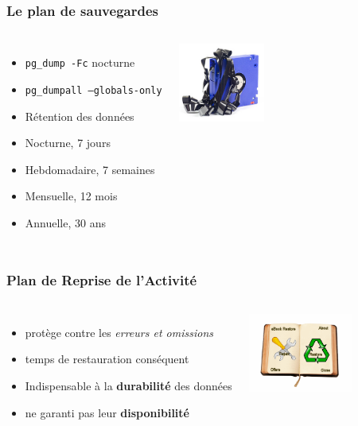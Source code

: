 \documentclass[english]{beamer}
\begin{document}
\begin{frame}[fragile]
  \frametitle{Le plan de sauvegardes}


\begin{columns}[c]

  \begin{itemize}
   \item<1-> \texttt{pg\_dump -Fc} nocturne
   \item<1-> \texttt{pg\_dumpall --globals-only}
   \item<2-> Rétention des données
   \item<2-> Nocturne, 7 jours
   \item<2-> Hebdomadaire, 7 semaines
   \item<2-> Mensuelle, 12 mois
   \item<3-> Annuelle, 30 ans
  \end{itemize}  

\includegraphics[height=7em]{online-backup.jpg}
\end{columns}
\end{frame}

\begin{frame}[fragile]
  \frametitle{Plan de Reprise de l'Activité}

  \linebreak
  \linebreak

\begin{columns}[c]

  \begin{itemize}
    \item<1-> protège contre les \textit{erreurs et omissions}
    \item<1-> temps de restauration conséquent
    \item<2-> Indispensable à la \textbf{durabilité} des données
    \item<2-> ne garanti pas leur \textbf{disponibilité}
  \end{itemize}

\includegraphics[height=7em]{restore.png}
\end{columns}
\end{frame}
\end{document}
